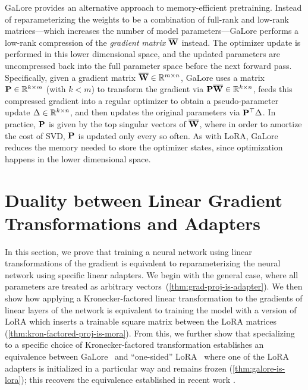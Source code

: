 GaLore provides an alternative approach to memory-efficient pretraining. 
Instead of reparameterizing the {weights} to be a combination of full-rank and low-rank matrices---which increases the number of model parameters---GaLore performs a low-rank compression  of the \emph{gradient} \emph{matrix}  $\overline{{\mathbf{W}}}$ instead.
The optimizer update is performed in this lower dimensional space, and the updated parameters are uncompressed back into the full parameter space before the next forward pass.
Specifically, given a gradient matrix $\overline{{\mathbf{W}}} \in \mathbb{R}^{m \times n}$, GaLore uses a matrix ${\mathbf{P}} \in \mathbb{R}^{k \times m}$ (with $k < m$) to transform the gradient via ${\mathbf{P}} \overline{{\mathbf{W}}} \in \mathbb{R}^{k \times n}$, feeds this compressed gradient into a regular optimizer to obtain a pseudo-parameter update $\Delta \in \mathbb{R}^{k \times n}$, and then updates the original parameters via  ${\mathbf{P}}^\top {\Delta}$.
In practice, ${\mathbf{P}}$  is given by the top singular vectors of $\overline{{\mathbf{W}}}$, where
in order to amortize the cost of SVD, ${\mathbf{P}}$ is updated only every so often.
As with LoRA, GaLore reduces the memory needed to store the optimizer states, since optimization happens in the lower dimensional space.




\vcram{-2mm}
\section{Duality between Linear Gradient Transformations and Adapters}
\vcram{-2mm}
\label{sec:theory}

In this section, we prove that training a neural network using  linear transformations of the gradient is equivalent to reparameterizing the neural network using specific linear adapters.
We  begin with the general case, where all parameters are treated as arbitrary vectors~(\cref{thm:grad-proj-is-adapter}).
We then show how applying a Kronecker-factored linear transformation to the gradients of linear layers of the network is equivalent to training the model with a version of LoRA which inserts a trainable square matrix between the LoRA matrices (\cref{thm:kron-factored-proj-is-mora}).
From this, we further show that specializing to a specific choice of Kronecker-factored transformation establishes an equivalence between GaLore~\citep{galore} and ``one-sided'' LoRA~\citep{lora} where one of the LoRA adapters is initialized in a particular way and remains frozen (\cref{thm:galore-is-lora}); this recovers the equivalence established in recent work \citep{hao2024flora,loeschckeloqt}.



